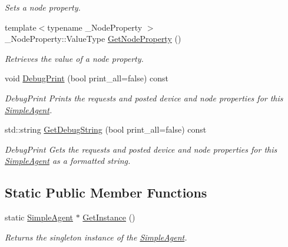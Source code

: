 \begin{DoxyCompactItemize}
\begin{DoxyCompactList}\small\item\em Sets a node property. \end{DoxyCompactList}\item 
{\footnotesize template$<$typename \+\_\+\+Node\+Property $>$ }\\\+\_\+\+Node\+Property\+::\+Value\+Type \hyperlink{classcubesat_1_1SimpleAgent_a6bb98053dc51209a14907296ba1670f0}{Get\+Node\+Property} ()
\begin{DoxyCompactList}\small\item\em Retrieves the value of a node property. \end{DoxyCompactList}\item 
void \hyperlink{classcubesat_1_1SimpleAgent_af5c2133bcbb45de986a69343c13ed513}{Debug\+Print} (bool print\+\_\+all=false) const
\begin{DoxyCompactList}\small\item\em Debug\+Print Prints the requests and posted device and node properties for this \hyperlink{classcubesat_1_1SimpleAgent}{Simple\+Agent}. \end{DoxyCompactList}\item 
std\+::string \hyperlink{classcubesat_1_1SimpleAgent_a3fa7d4df2b024aed0c1336ca2c3e9f7c}{Get\+Debug\+String} (bool print\+\_\+all=false) const
\begin{DoxyCompactList}\small\item\em Debug\+Print Gets the requests and posted device and node properties for this \hyperlink{classcubesat_1_1SimpleAgent}{Simple\+Agent} as a formatted string. \end{DoxyCompactList}\end{DoxyCompactItemize}
\subsection*{Static Public Member Functions}
\begin{DoxyCompactItemize}
\item 
static \hyperlink{classcubesat_1_1SimpleAgent}{Simple\+Agent} $\ast$ \hyperlink{classcubesat_1_1SimpleAgent_a0313b247dbfab606a155e69798cfccdd}{Get\+Instance} ()
\begin{DoxyCompactList}\small\item\em Returns the singleton instance of the \hyperlink{classcubesat_1_1SimpleAgent}{Simple\+Agent}. \end{DoxyCompactList}\end{DoxyCompactItemize}
